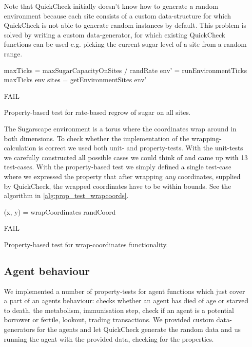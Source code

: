 Note that QuickCheck initially doesn't know how to generate a random environment because each site consists of a custom data-structure for which QuickCheck is not able to generate random instances by default. This problem is solved by writing a custom data-generator, for which existing QuickCheck functions can be used e.g. picking the current sugar level of a site from a random range.

\begin{algorithm}
maxTicks = maxSugarCapacityOnSites / randRate\;
env' = runEnvironmentTicks maxTicks env\;
sites = getEnvironmentSites env'\;

 {
  FAIL\;
}
\caption{Property-based test for rate-based regrow of sugar on all sites.}
\end{algorithm}
\label{alg:prop_test_rateregwroth}

The Sugarscape environment is a torus where the coordinates wrap around in both dimensions. To check whether the implementation of the wrapping-calculation is correct we used both unit- and property-tests. With the unit-tests we carefully constructed all possible cases we could think of and came up with 13 test-cases. With the property-based test we simply defined a single test-case where we expressed the property that after wrapping \textit{any} coordinates, supplied by QuickCheck, the wrapped coordinates have to be within bounds. See the algorithm in \ref{alg:prop_test_wrapcoords}.

\begin{algorithm}
(x, y) = wrapCoordinates randCoord\;

 {
  FAIL\;
}
\caption{Property-based test for wrap-coordinates functionality.}
\end{algorithm}
\label{alg:prop_test_wrapcoords}

\subsection{Agent behaviour}
We implemented a number of property-tests for agent functions which just cover a part of an agents behaviour: checks whether an agent has died of age or starved to death, the metabolism, immunisation step, check if an agent is a potential borrower or fertile, lookout, trading transactions. We provided custom data-generators for the agents and let QuickCheck generate the random data and us running the agent with the provided data, checking for the properties. 

